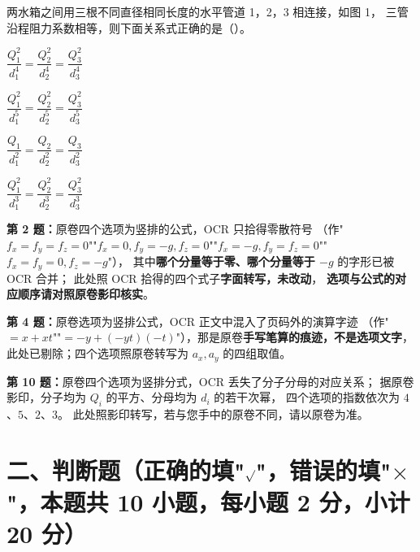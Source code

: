 \begin{ti}
  \item 两水箱之间用三根不同直径相同长度的水平管道 1，2，3 相连接，如图 1，
  三管沿程阻力系数相等，则下面关系式正确的是（\quad）。\hfill{}
  \begin{choices}
    \item $\dfrac{Q_1^2}{d_1^4}=\dfrac{Q_2^2}{d_2^4}=\dfrac{Q_3^2}{d_3^4}$
    \item $\dfrac{Q_1^2}{d_1^5}=\dfrac{Q_2^2}{d_2^5}=\dfrac{Q_3^2}{d_3^5}$
    \item $\dfrac{Q_1}{d_1^2}=\dfrac{Q_2}{d_2^2}=\dfrac{Q_3}{d_3^2}$
    \item $\dfrac{Q_1^2}{d_1^3}=\dfrac{Q_2^2}{d_2^3}=\dfrac{Q_3^2}{d_3^3}$
  \end{choices}
\end{ti}

\begin{tishi}
\textbf{第 2 题：}原卷四个选项为竖排的公式，OCR 只拾得零散符号
（作"\(f_x=f_y=f_z=0\)""\(f_x=0,f_y=-g,f_z=0\)""\(f_x=-g,f_y=f_z=0\)""\(f_x=f_y=0,f_z=-g\)"），
其中\textbf{哪个分量等于零、哪个分量等于 \(-g\)} 的字形已被 OCR 合并；
此处照 OCR 拾得的四个式子\textbf{字面转写，未改动}，
\textbf{选项与公式的对应顺序请对照原卷影印核实}。

\textbf{第 4 题：}原卷选项为竖排公式，OCR 正文中混入了页码外的演算字迹
（作"\(=x+xt\)""\(=-y+(-yt)(-t)\)"），那是原卷\textbf{手写笔算的痕迹，不是选项文字}，
此处已剔除；四个选项照原卷转写为 \(a_x,a_y\) 的四组取值。

\textbf{第 10 题：}原卷四个选项为竖排分式，OCR 丢失了分子分母的对应关系；
据原卷影印，分子均为 \(Q_i\) 的平方、分母均为 \(d_i\) 的若干次幂，
四个选项的指数依次为 \(4\)、\(5\)、\(2\)、\(3\)。
此处照影印转写，若与您手中的原卷不同，请以原卷为准。
\end{tishi}

\section{二、判断题（正确的填"$\surd$"，错误的填"$\times$"，本题共 10 小题，每小题 2 分，小计 20 分）}

